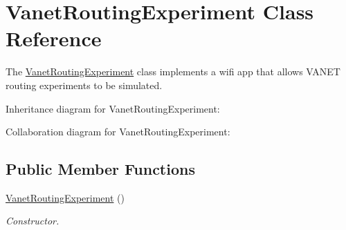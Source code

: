 \hypertarget{classVanetRoutingExperiment}{}\section{Vanet\+Routing\+Experiment Class Reference}
\label{classVanetRoutingExperiment}


The \hyperlink{classVanetRoutingExperiment}{Vanet\+Routing\+Experiment} class implements a wifi app that allows V\+A\+N\+ET routing experiments to be simulated.  




Inheritance diagram for Vanet\+Routing\+Experiment\+:


Collaboration diagram for Vanet\+Routing\+Experiment\+:
\subsection*{Public Member Functions}
\begin{DoxyCompactItemize}
\item 
\hyperlink{classVanetRoutingExperiment_a1216b8c88cf6547a93871340d3005c87}{Vanet\+Routing\+Experiment} ()
\begin{DoxyCompactList}\small\item\em Constructor. \end{DoxyCompactList}\end{DoxyCompactItemize}
